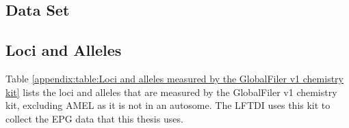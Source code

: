 
\begin{theappendices}


\chapter{Data Set}
\thispagestyle{myheadings}

\section{Loci and Alleles}
\label{appendix:section:Loci and Alleles}

Table \ref{appendix:table:Loci and alleles measured by the GlobalFiler v1 chemistry kit} lists the loci and alleles that are measured by the GlobalFiler v1 chemistry kit, excluding AMEL as it is not in an autosome. The LFTDI uses this kit to collect the EPG data that this thesis uses.


\end{theappendices}
